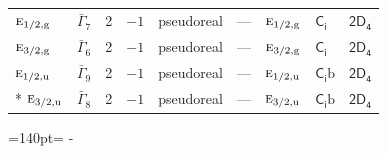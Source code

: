 \documentclass[10pt,a4paper]{article}
\makeatletter
\def\grouprule#1#2{\noalign{\marks\LTgroupmarks{\the\belowrulesep}\nobreak\vskip#1%
  \vskip\aboverulesep}\multispan\LT@cols\unskip{\leaders\hrule\@height#2\hfill\kern\z@}\cr
  \noalign{\penalty\LTrulebreak\vskip\belowrulesep\global\@lastruleclass\z@}}
\newcommand{\needspace}[1]{\par\penalty-100\begingroup\dimen0=#1\relax\dimen2=\pagegoal
  \advance\dimen2-\pagetotal\ifdim\dimen0>\dimen2\relax\ifdim\dimen2>0pt\vfil\break\fi\fi
  \endgroup}
\numberwithin{equation}{section}
\newcommand{\grp}[1]{\mathsf{#1}}
\newcommand{\irr}[1]{\text{\normalfont\scshape #1}}
\newcommand{\ptag}[1]{\mathrm{#1}}
\newcommand{\secondclass}{\mathrm{b}}
\makeatother
\begin{document}
{\begin{longtable}{@{}llrrlllll@{}}
\grouprule{0pt}{\lightrulewidth}
$\irr{e}_{1/2,\ptag{g}}$ & $\bar{\Gamma}_{7}$ & 2 & $-1$ & pseudoreal & --- & $\irr{e}_{1/2,\ptag{g}}$ & \href{S2.pdf}{$\grp{C_{i}}$} & \href{2D4.pdf}{$\grp{2D_{4}}$}\\
$\irr{e}_{3/2,\ptag{g}}$ & $\bar{\Gamma}_{6}$ & 2 & $-1$ & pseudoreal & --- & $\irr{e}_{3/2,\ptag{g}}$ & \href{S2.pdf}{$\grp{C_{i}}$} & \href{2D4.pdf}{$\grp{2D_{4}}$}\\
$\irr{e}_{1/2,\ptag{u}}$ & $\bar{\Gamma}_{9}$ & 2 & $-1$ & pseudoreal & --- & $\irr{e}_{1/2,\ptag{u}}$ & \href{S2b.pdf}{$\grp{C_{i}}\secondclass$} & \href{2D4.pdf}{$\grp{2D_{4}}$}\\*
$\irr{e}_{3/2,\ptag{u}}$ & $\bar{\Gamma}_{8}$ & 2 & $-1$ & pseudoreal & --- & $\irr{e}_{3/2,\ptag{u}}$ & \href{S2b.pdf}{$\grp{C_{i}}\secondclass$} & \href{2D4.pdf}{$\grp{2D_{4}}$}\\
\bottomrule\end{longtable}}
\needspace{140pt}
\end{document}
